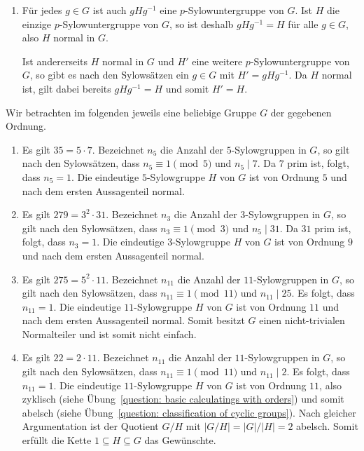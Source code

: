 \begin{solution}
  \begin{enumerate}
    \item
      Für jedes $g \in G$ ist auch $g H g^{-1}$ eine $p$-Sylowuntergruppe von $G$.
      Ist $H$ die einzige $p$-Sylowuntergruppe von $G$, so ist deshalb $gHg^{-1} = H$ für alle $g \in G$, also $H$ normal in $G$.
      
      Ist andererseits $H$ normal in $G$ und $H'$ eine weitere $p$-Sylowuntergruppe von $G$, so gibt es nach den Sylowsätzen ein $g \in G$ mit $H' = g H g^{-1}$.
      Da $H$ normal ist, gilt dabei bereits $g H g^{-1} = H$ und somit $H' = H$.
  \end{enumerate}
  Wir betrachten im folgenden jeweils eine beliebige Gruppe $G$ der gegebenen Ordnung.
  \begin{enumerate}[resume]
    \item
      Es gilt $35 = 5 \cdot 7$.
      Bezeichnet $n_5$ die Anzahl der $5$-Sylowgruppen in $G$, so gilt nach den Sylowsätzen, dass $n_5 \equiv 1 \pmod{5}$ und $n_5 \mid 7$.
      Da $7$ prim ist, folgt, dass $n_5 = 1$.
      Die eindeutige $5$-Sylowgruppe $H$ von $G$ ist von Ordnung $5$ und nach dem ersten Aussagenteil normal.
      
    \item
      Es gilt $279 = 3^2 \cdot 31$.
      Bezeichnet $n_3$ die Anzahl der $3$-Sylowgruppen in $G$, so gilt nach den Sylowsätzen, dass $n_3 \equiv 1 \pmod{3}$ und $n_5 \mid 31$.
      Da $31$ prim ist, folgt, dass $n_3 = 1$.
      Die eindeutige $3$-Sylowgruppe $H$ von $G$ ist von Ordnung $9$ und nach dem ersten Aussagenteil normal.
      
    \item
      Es gilt $275 = 5^2 \cdot 11$.
      Bezeichnet $n_{11}$ die Anzahl der $11$-Sylowgruppen in $G$, so gilt nach den Sylowsätzen, dass $n_{11} \equiv 1 \pmod{11}$ und $n_{11} \mid 25$.
      Es folgt, dass $n_{11}  = 1$.
      Die eindeutige $11$-Sylowgruppe $H$ von $G$ ist von Ordnung $11$ und nach dem ersten Aussagenteil normal.
      Somit besitzt $G$ einen nicht-trivialen Normalteiler und ist somit nicht einfach.
      
    \item
      Es gilt $22 = 2 \cdot 11$.
      Bezeichnet $n_{11}$ die Anzahl der $11$-Sylowgruppen in $G$, so gilt nach den Sylowsätzen, dass $n_{11} \equiv 1 \pmod{11}$ und $n_{11} \mid 2$.
      Es folgt, dass $n_{11}  = 1$.
      Die eindeutige $11$-Sylowgruppe $H$ von $G$ ist von Ordnung $11$, also zyklisch (siehe Übung~\ref{question: basic calculatings with orders}) und somit abelsch (siehe Übung~\ref{question: classification of cyclic groups}).
      Nach gleicher Argumentation ist der Quotient $G/H$ mit $|G/H| = |G|/|H| = 2$ abelsch.
      Somit erfüllt die Kette $1 \subseteq H \subseteq G$ das Gewünschte.
      

\end{enumerate}
\end{solution}
